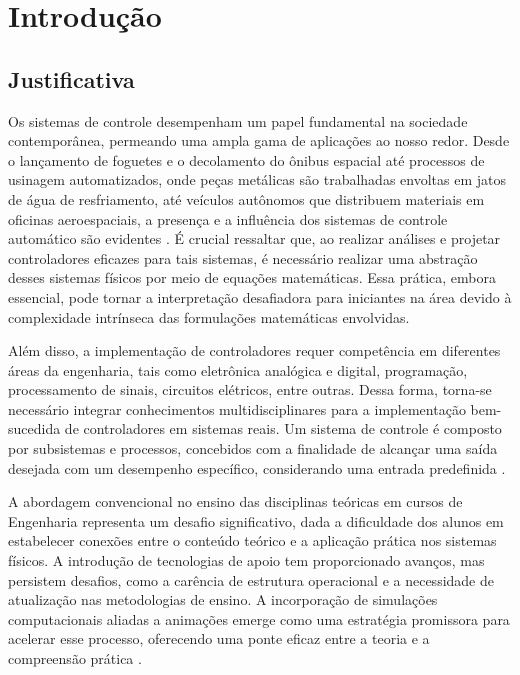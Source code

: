 
\chapter{Introdução}
\label{ch:intro}

\section{Justificativa}

Os sistemas de controle desempenham um papel fundamental na sociedade contemporânea, permeando uma ampla gama de aplicações ao nosso redor. Desde o lançamento de foguetes e o decolamento do ônibus espacial até processos de usinagem automatizados, onde peças metálicas são trabalhadas envoltas em jatos de água de resfriamento, até veículos autônomos que distribuem materiais em oficinas aeroespaciais, a presença e a influência dos sistemas de controle automático são evidentes \cite{nise2013}. É crucial ressaltar que, ao realizar análises e projetar controladores eficazes para tais sistemas, é necessário realizar uma abstração desses sistemas físicos por meio de equações matemáticas. Essa prática, embora essencial, pode tornar a interpretação desafiadora para iniciantes na área devido à complexidade intrínseca das formulações matemáticas envolvidas.

Além disso, a implementação de controladores requer competência em diferentes áreas da engenharia, tais como eletrônica analógica e digital, programação, processamento de sinais, circuitos elétricos, entre outras. Dessa forma, torna-se necessário integrar conhecimentos multidisciplinares para a implementação bem-sucedida de controladores em sistemas reais. Um sistema de controle é composto por subsistemas e processos, concebidos com a finalidade de alcançar uma saída desejada com um desempenho específico, considerando uma entrada predefinida \cite{nise2013}.

A abordagem convencional no ensino das disciplinas teóricas em cursos de Engenharia representa um desafio significativo, dada a dificuldade dos alunos em estabelecer conexões entre o conteúdo teórico e a aplicação prática nos sistemas físicos. A introdução de tecnologias de apoio tem proporcionado avanços, mas persistem desafios, como a carência de estrutura operacional e a necessidade de atualização nas metodologias de ensino. A incorporação de simulações computacionais aliadas a animações emerge como uma estratégia promissora para acelerar esse processo, oferecendo uma ponte eficaz entre a teoria e a compreensão prática \cite{yuri_tcc}.

